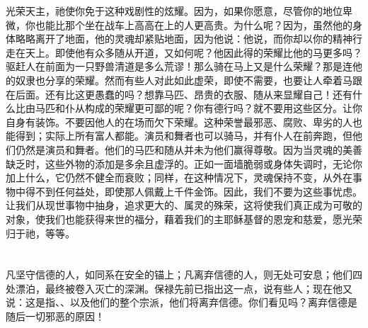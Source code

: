 光荣天主，祂使你免于这种戏剧性的炫耀。因为，如果你愿意，尽管你的地位卑微，你也能比那个坐在战车上高高在上的人更高贵。为什么呢？因为，虽然他的身体略略离开了地面，他的灵魂却紧贴地面，因为他说：他说，而你却以你的精神行走在天上。即使他有众多随从开道，又如何呢？他因此得的荣耀比他的马更多吗？驱赶人在前面为一只野兽清道是多么荒谬！那么骑在马上又是什么荣耀？那是连他的奴隶也分享的荣耀。然而有些人对此如此虚荣，即使不需要，也要让人牵着马跟在后面。还有比这更愚蠢的吗？想靠马匹、昂贵的衣服、随从来显耀自己！还有什么比由马匹和仆从构成的荣耀更可鄙的呢？你有德行吗？就不要用这些区分。让你自身有装饰。不要因他人的在场而欠下荣耀。这种荣誉最邪恶、腐败、卑劣的人也能得到；实际上所有富人都能。演员和舞者也可以骑马，并有仆人在前奔跑，但他们仍然是演员和舞者。他们的马匹和随从并未为他们赢得尊敬。因为当灵魂的美善缺乏时，这些外物的添加是多余且虚浮的。正如一面墙脆弱或身体失调时，无论你加上什么，它仍然不健全而衰败；同样，在这种情况下，灵魂保持不变，从外在事物中得不到任何益处，即使那人佩戴上千件金饰。因此，我们不要为这些事忧虑。让我们从现世事物中抽身，追求更大的、属灵的殊荣，这将使我们真正成为可敬的对象，使我们也能获得来世的福分，藉着我们的主耶稣基督的恩宠和慈爱，愿光荣归于祂，等等。\par



\section{}

\par

\par

凡坚守信德的人，如同系在安全的锚上；凡离弃信德的人，则无处可安息；他们四处漂泊，最终被卷入灭亡的深渊。保禄先前已指出这一点，说有些人；现在他又说：这是指、、以及他们的整个宗派，他们将离弃信德。你们看见吗？离弃信德是随后一切邪恶的原因！\par

